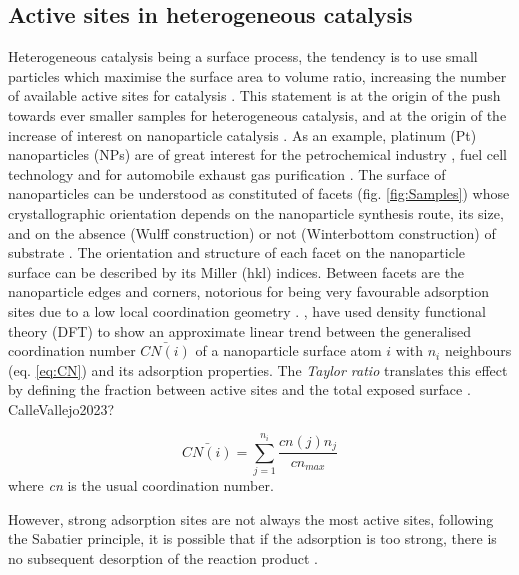 \subsection{Active sites in heterogeneous catalysis}

Heterogeneous catalysis being a surface process, the tendency is to use small particles which maximise the surface area to volume ratio, increasing the number of available active sites for catalysis \parencite{Vogt2022}.
This statement is at the origin of the push towards ever smaller samples for heterogeneous catalysis, and at the origin of the increase of interest on nanoparticle catalysis \parencite{CHE1989, Molenbroek2009, vanSanten2010, Schauermann2013}.
As an example, platinum (Pt) nanoparticles (NPs) are of great interest for the petrochemical industry \parencite{Astruc2005}, fuel cell technology and for automobile exhaust gas purification \parencite{HECK2001}.
The surface of nanoparticles can be understood as constituted of facets (fig. \ref{fig:Samples}) whose crystallographic orientation depends on the nanoparticle synthesis route, its size, and on the absence (Wulff construction) or not (Winterbottom construction) of substrate \parencite{WINTERBOTTOM1967, Boukouvala2021}.
The orientation and structure of each facet on the nanoparticle surface can be described by its Miller (hkl) indices.
Between facets are the nanoparticle edges and corners, notorious for being very favourable adsorption sites due to a low local coordination geometry \parencite{Jiang2009}.
\cite{CalleVallejo2014}, \cite*{CalleVallejo2018} have used density functional theory (DFT) to show an approximate linear trend between the generalised coordination number $\bar{CN(i)}$ of a nanoparticle surface atom $i$ with $n_i$ neighbours (eq. \ref{eq:CN}) and its adsorption properties.
The \textit{Taylor ratio} translates this effect by defining the fraction between active sites and the total exposed surface \parencite{Taylor1925}.
\textcolor{Important}{CalleVallejo2023?}

\begin{equation}
    \bar{CN(i)} = \sum_{j=1}^{n_i} \frac{cn(j) n_j}{cn_{max}}
    \label{eq:CN}
\end{equation}
where \textit{cn} is the usual coordination number.%

However, strong adsorption sites are not always the most active sites, following the Sabatier principle, it is possible that if the adsorption is too strong, there is no subsequent desorption of the reaction product \parencite{Nilsson2005, Jiang2009}.

